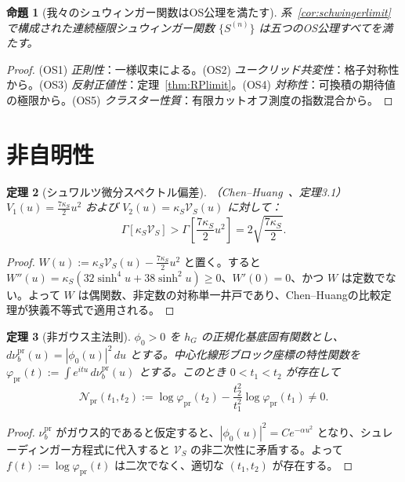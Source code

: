 \documentclass[12pt]{article}
\theoremstyle{plain}
\newtheorem{theorem}{定理}[section]
\newtheorem{proposition}[theorem]{命題}
\theoremstyle{definition}
\numberwithin{equation}{section}
\newcommand{\pr}{\mathrm{pr}}
\begin{document}
\begin{proposition}[我々のシュウィンガー関数はOS公理を満たす]\label{prop:OSverify}
系~\ref{cor:schwingerlimit}で構成された連続極限シュウィンガー関数 $\{S^{(n)}\}$ は五つのOS公理すべてを満たす。
\end{proposition}

\begin{proof}
(OS1) \emph{正則性}：一様収束による。(OS2) \emph{ユークリッド共変性}：格子対称性から。(OS3) \emph{反射正値性}：定理~\ref{thm:RPlimit}。(OS4) \emph{対称性}：可換積の期待値の極限から。(OS5) \emph{クラスター性質}：有限カットオフ測度の指数混合から。
\end{proof}

\section{非自明性}\label{sec:nontriviality}

\begin{theorem}[シュワルツ微分スペクトル偏差]\label{thm:spectraldeviation}
（Chen--Huang~\cite{ChenHuang2012}、定理3.1）
$V_1(u)=\frac{7\kappa_S}{2}u^2$ および $V_2(u)=\kappa_S\mathcal{V}_S(u)$ に対して：
\begin{equation}
\Gamma[\kappa_S\mathcal{V}_S] > \Gamma\!\left[\frac{7\kappa_S}{2}u^2\right] = 2\sqrt{\frac{7\kappa_S}{2}}.
\end{equation}
\end{theorem}

\begin{proof}
$W(u):=\kappa_S\mathcal{V}_S(u)-\frac{7\kappa_S}{2}u^2$ と置く。すると $W''(u)=\kappa_S(32\sinh^4 u+38\sinh^2 u)\geq 0$、$W'(0)=0$、かつ $W$ は定数でない。よって $W$ は偶関数、非定数の対称単一井戸であり、Chen--Huangの比較定理が狭義不等式で適用される。
\end{proof}

\begin{theorem}[非ガウス主法則]\label{thm:nonGaussian}
$\phi_0>0$ を $h_G$ の正規化基底固有関数とし、$d\nu_b^{\pr}(u)=|\phi_0(u)|^2\,du$ とする。中心化線形ブロック座標の特性関数を $\varphi_{\pr}(t):=\int e^{itu}\,d\nu_b^{\pr}(u)$ とする。このとき $0<t_1<t_2$ が存在して
\begin{equation}
\mathcal{N}_{\pr}(t_1,t_2) := \log\varphi_{\pr}(t_2) - \frac{t_2^2}{t_1^2}\log\varphi_{\pr}(t_1) \neq 0.
\end{equation}
\end{theorem}

\begin{proof}
$\nu_b^{\pr}$ がガウス的であると仮定すると、$|\phi_0(u)|^2=Ce^{-\alpha u^2}$ となり、シュレーディンガー方程式に代入すると $\mathcal{V}_S$ の非二次性に矛盾する。よって $f(t):=\log\varphi_{\pr}(t)$ は二次でなく、適切な $(t_1,t_2)$ が存在する。
\end{proof}
\end{document}
